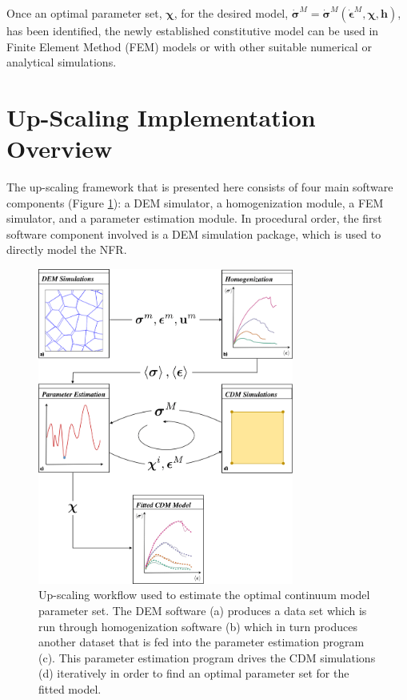 Once an optimal parameter set, $\boldsymbol{\chi}$, for the desired model, $\dot{\boldsymbol{\sigma}}^M=\dot{\boldsymbol{\sigma}}^M\left(\dot{\boldsymbol{\epsilon}}^M, \boldsymbol{\chi},\mathbf{h}\right)$, has been identified, the newly established constitutive model can be used in Finite Element Method (FEM) models or with other suitable numerical or analytical simulations.

\section{Up-Scaling Implementation Overview}

The up-scaling framework that is presented here consists of four main software components (Figure \ref{fig:workflow}): a DEM simulator, a homogenization module, a FEM simulator, and a parameter estimation module. In procedural order, the first software component involved is a DEM simulation package, which is used to directly model the NFR. 

\begin{figure}[p]
\begin{center}
\includegraphics[width=0.75\textwidth]{figures/Chapter3/UpScalingFlowChart}
\caption{{\label{fig:workflow}Up-scaling workflow used to estimate the optimal continuum model parameter set. The DEM software (a) produces a data set which is run through homogenization software (b) which in turn produces another dataset that is fed into the parameter estimation program (c). This parameter estimation program drives the CDM simulations (d) iteratively in order to find an optimal parameter set for the fitted model.%
}}
\end{center}
\end{figure}

